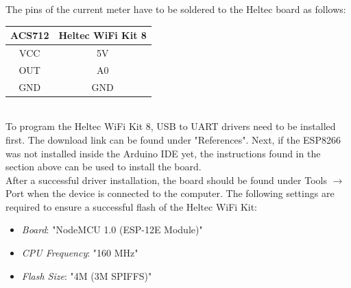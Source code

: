 The pins of the current meter have to be soldered to the Heltec board as follows:
\\
\begin{center}
    \begin{tabular} { |c|c| }
        \hline
        ACS712 & Heltec WiFi Kit 8 \\
        \hline\hline
        VCC & 5V \\
        \hline
        OUT & A0 \\
        \hline
        GND & GND \\
        \hline
    \end{tabular}
\end{center}
\leavevmode
\\
To program the Heltec WiFi Kit 8, USB to UART drivers need to be installed first. The download link can be found under "References"\cite{vcp-drivers}. Next, if the ESP8266 was not installed inside the Arduino IDE yet, the instructions found in the section above can be used to install the board.
\\
After a successful driver installation, the board should be found under Tools $\rightarrow$ Port when the device is connected to the computer.
\newpage
The following settings are required to ensure a successful flash of the Heltec WiFi Kit:

\begin{itemize}
    \item \textit{Board}: "NodeMCU 1.0 (ESP-12E Module)"
    \item \textit{CPU Frequency}: "160 MHz"
    \item \textit{Flash Size}: "4M (3M SPIFFS)"
\end{itemize}
\leavevmode

